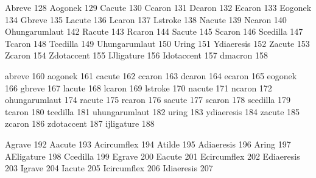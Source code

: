  Abreve          128
 Aogonek         129
 Cacute          130
 Ccaron          131
 Dcaron          132
 Ecaron          133
 Eogonek         134
 Gbreve          135
 Lacute          136
 Lcaron          137
 Lstroke         138
 Nacute          139
 Ncaron          140
 Ohungarumlaut   142
 Racute          143
 Rcaron          144
 Sacute          145
 Scaron          146
 Scedilla        147
 Tcaron          148
 Tcedilla        149
 Uhungarumlaut   150
 Uring           151
 Ydiaeresis      152
 Zacute          153
 Zcaron          154
 Zdotaccent      155
 IJligature      156
 Idotaccent      157
 dmacron         158
  
 abreve          160
 aogonek         161
 cacute          162
 ccaron          163
 dcaron          164
 ecaron          165
 eogonek         166
 gbreve          167
 lacute          168
 lcaron          169
 lstroke         170
 nacute          171
 ncaron          172
 ohungarumlaut   174
 racute          175
 rcaron          176
 sacute          177
 scaron          178
 scedilla        179
 tcaron          180
 tcedilla        181
 uhungarumlaut   182
 uring           183
 ydiaeresis      184
 zacute          185
 zcaron          186
 zdotaccent      187
 ijligature      188
  
 Agrave          192
 Aacute          193
 Acircumflex     194
 Atilde          195
 Adiaeresis      196
 Aring           197
 AEligature      198
 Ccedilla        199
 Egrave          200
 Eacute          201
 Ecircumflex     202
 Ediaeresis      203
 Igrave          204
 Iacute          205
 Icircumflex     206
 Idiaeresis      207

